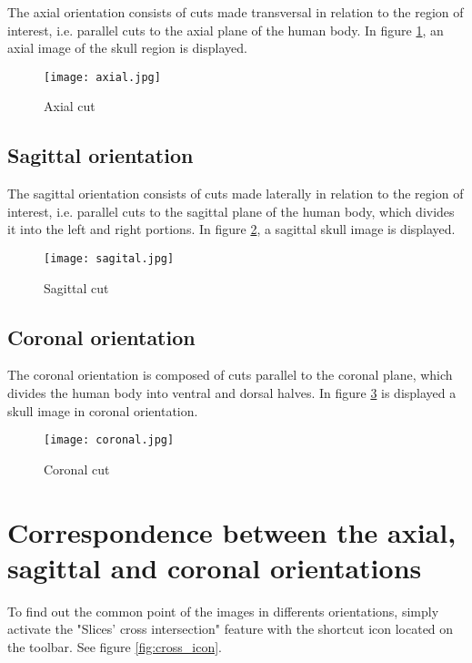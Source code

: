 The axial orientation consists of cuts made transversal in relation to the region of interest, i.e. parallel cuts to the axial plane of the human body.
In figure \ref{fig:axial_corte}, an axial image of the skull region is displayed.

\begin{figure}[!htb]
\centering
\texttt{[image: axial.jpg]}
\caption{Axial cut}
\label{fig:axial_corte}
\end{figure}

\subsection{Sagittal orientation}

The sagittal orientation consists of cuts made laterally in relation to the region of interest, i.e. parallel cuts to the sagittal plane of the human body, which divides it into the left and right portions.
In figure \ref{fig:sagital_slice}, a sagittal skull image is displayed.

\begin{figure}[!htb]
\centering
\texttt{[image: sagital.jpg]}
\caption{Sagittal cut}
\label{fig:sagital_slice}
\end{figure}

\newpage

\subsection{Coronal orientation}

The coronal orientation is composed of cuts parallel to the coronal plane, which divides the human body into ventral and dorsal halves.
In figure \ref{fig:coronal_slice} is displayed  a skull image in coronal orientation.

\begin{figure}[!htb]
\centering
\texttt{[image: coronal.jpg]}
\caption{Coronal cut}
\label{fig:coronal_slice}
\end{figure}


\section{Correspondence between the axial, sagittal and coronal orientations}
\label{sec:corresp_all_orient}

To find out the common point of the images in differents orientations, simply activate the "Slices' cross intersection" feature with the shortcut icon located on the toolbar.
See figure \ref{fig:cross_icon}.

